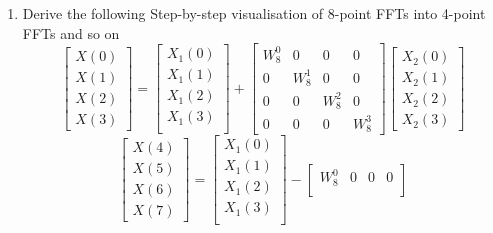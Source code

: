 \documentclass[journal,12pt,twocolumn]{IEEEtran}
\renewcommand\thesection{\arabic{section}}
\begin{document}
\begin{enumerate}[label=\thesection.\arabic*
	,ref=\thesection.\theenumi]
\begin{enumerate}[label=\arabic*.,ref=\thesection.\theenumi]
	\solution
	\begin{align}
		\brak{\vec{F}_{N}\vec{x}}_{k} = \sum_{m=0}^{N-1}W_{N}^{mk}x(m)\\
		= \sum_{m=0}^{N-1} x(m) e^{-j 2 \pi k m / N}
		= X(k) = \vec{X}_{k} 
	\end{align}
	\item Derive the following Step-by-step visualisation  of
	8-point FFTs into 4-point FFTs and so on
	\begin{equation}
		\begin{bmatrix}
			X(0) \\ 
			X(1) \\ 
			X(2) \\ 
			X(3)
		\end{bmatrix}
		=
		\begin{bmatrix}
			X_{1}(0) \\ 
			X_{1}(1)\\ 
			X_{1}(2)\\
			X_{1}(3)\\
		\end{bmatrix}
		+
		\begin{bmatrix}
			W^{0}_{8} & 0 & 0 & 0\\
			0 & W^{1}_{8} & 0 & 0\\
			0 & 0 & W^{2}_{8} & 0\\
			0 & 0 & 0 & W^{3}_{8}
		\end{bmatrix}
		\begin{bmatrix}
			X_{2}(0) \\ 
			X_{2}(1) \\ 
			X_{2}(2) \\
			X_{2}(3)
		\end{bmatrix}
	\end{equation}
	\begin{equation}
		\begin{bmatrix}
			X(4) \\ 
			X(5) \\ 
			X(6) \\ 
			X(7)
		\end{bmatrix}
		=
		\begin{bmatrix}
			X_{1}(0) \\ 
			X_{1}(1)\\ 
			X_{1}(2)\\
			X_{1}(3)\\
		\end{bmatrix}
		-
		\begin{bmatrix}
			W^{0}_{8} & 0 & 0 & 0\\

\end{bmatrix}
\end{equation}
\end{enumerate}
\end{enumerate}
\end{document}
